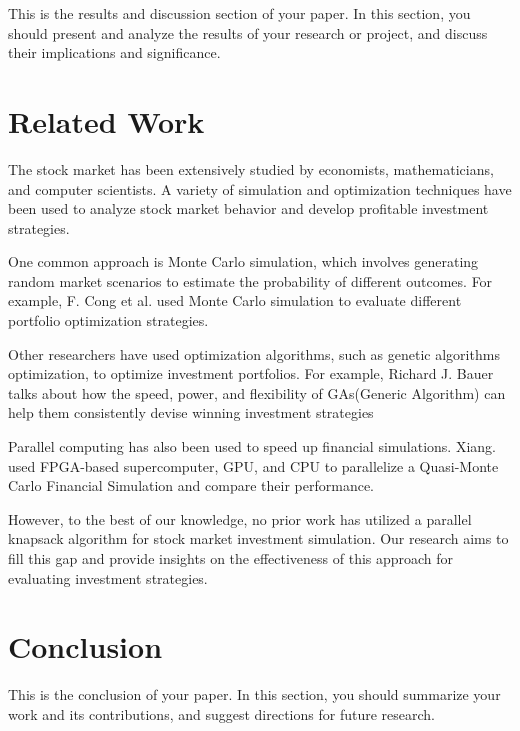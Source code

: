 \documentclass[conference]{IEEEtran}
\begin{document}
This is the results and discussion section of your paper. In this section, you should present and analyze the results of your research or project, and discuss their implications and significance.

\section{Related Work}
\label{sec:Related Work}
The stock market has been extensively studied by economists, mathematicians, and computer scientists. A variety of simulation and optimization techniques have been used to analyze stock market behavior and develop profitable investment strategies.

One common approach is Monte Carlo simulation, which involves generating random market scenarios to estimate the probability of different outcomes. For example, F. Cong et al. \cite{CONG201623} used Monte Carlo simulation to evaluate different portfolio optimization strategies.

Other researchers have used optimization algorithms, such as genetic algorithms optimization, to optimize investment portfolios. For example, Richard J. Bauer \cite{bauer1994genetic} talks about how the speed, power, and flexibility of GAs(Generic Algorithm) can help them consistently devise winning investment strategies

Parallel computing has also been used to speed up financial simulations. Xiang. \cite{xiang2010MPI} used FPGA-based supercomputer, GPU, and CPU to parallelize a Quasi-Monte Carlo Financial Simulation and compare their performance.

However, to the best of our knowledge, no prior work has utilized a parallel knapsack algorithm for stock market investment simulation. Our research aims to fill this gap and provide insights on the effectiveness of this approach for evaluating investment strategies.
\section{Conclusion}
\label{sec:conclusion}

This is the conclusion of your paper. In this section, you should summarize your work and its contributions, and suggest directions for future research.



\end{document}
